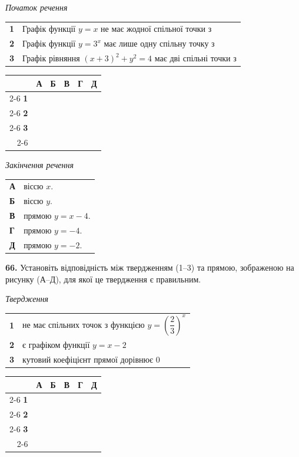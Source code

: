 \documentclass[14pt]{extarticle}
\newcommand{\answerGrid}{
    \begingroup
    \renewcommand{\arraystretch}{1.3} 
    \setlength{\tabcolsep}{7pt} 
    \begin{tabular}{r|c|c|c|c|c|}
         \multicolumn{1}{c}{} & \multicolumn{1}{c}{\textbf{А}} & \multicolumn{1}{c}{\textbf{Б}} & \multicolumn{1}{c}{\textbf{В}} & \multicolumn{1}{c}{\textbf{Г}} & \multicolumn{1}{c}{\textbf{Д}} \\ \cline{2-6}
         \textbf{1} & & & & & \\ \cline{2-6}
         \textbf{2} & & & & & \\ \cline{2-6}
         \textbf{3} & & & & & \\ \cline{2-6}
    \end{tabular}
    \endgroup
}
\begin{document}
\noindent
\begin{minipage}[t]{0.50\textwidth}
    \textit{Початок речення} \par \vspace{0.2cm}
    \begin{tabular}{@{}p{0.5cm} p{7cm}@{}}
    \textbf{1} & Графік функції $y=x$ не має жодної спільної точки з \\[0.4cm]
    \textbf{2} & Графік функції $y=3^x$ має лише одну спільну точку з \\[0.4cm]
    \textbf{3} & Графік рівняння $(x+3)^2+y^2=4$ має дві спільні точки з \\
    \end{tabular}

    \vspace{1.0cm}
    \answerGrid
\end{minipage}%
\hfill
\begin{minipage}[t]{0.45\textwidth}
    \textit{Закінчення речення} \par \vspace{0.2cm}
    \begin{tabular}{@{}p{0.5cm} p{6cm}@{}}
    \textbf{А} & віссю $x$. \\[0.2cm]
    \textbf{Б} & віссю $y$. \\[0.2cm]
    \textbf{В} & прямою $y=x-4$. \\[0.2cm]
    \textbf{Г} & прямою $y=-4$. \\[0.2cm]
    \textbf{Д} & прямою $y=-2$. \\
    \end{tabular}
\end{minipage}

\vspace{0.7cm}

\noindent\textbf{66.} Установіть відповідність між твердженням (1--3) та прямою, зображеною на рисунку (А--Д), для якої це твердження є правильним.

\vspace{0.3cm}

\noindent
\begin{minipage}[t]{0.60\textwidth}
    \textit{Твердження} \par \vspace{0.2cm}
    \begin{tabular}{@{}p{0.4cm} p{9cm}@{}}
    \textbf{1} & не має спільних точок з функцією $y=\left(\dfrac{2}{3}\right)^x$ \\[0.4cm]
    \textbf{2} & є графіком функції $y=x-2$ \\[0.4cm]
    \textbf{3} & кутовий коефіцієнт прямої дорівнює $0$ \\
    \end{tabular}
\end{minipage}%
\hfill
\begin{minipage}[t]{0.30\textwidth}
    \vspace{0.5cm}
    \answerGrid
\end{minipage}
\end{document}
